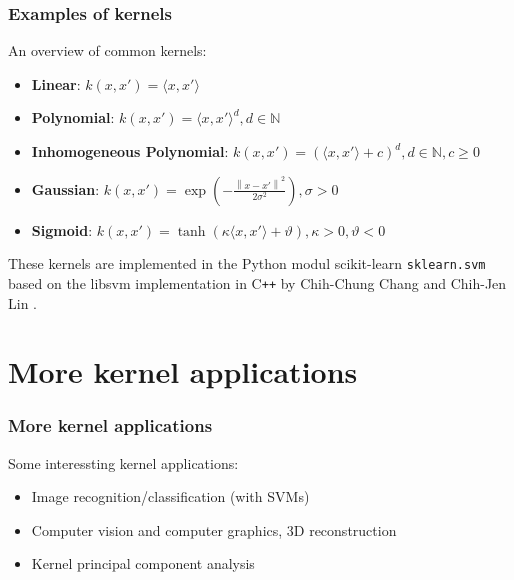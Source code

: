 \documentclass{beamer}
\begin{document}
\begin{frame}{}
	\frametitle{Examples of kernels}
    An overview of common kernels:
    \begin{itemize}
        \item \textbf{Linear}: $k(x,x') = \langle x, x' \rangle$
        \item \textbf{Polynomial}: $k(x,x') = \langle x, x' \rangle^{d}, d \in \mathbb{N}$
        \item \textbf{Inhomogeneous Polynomial}: $k(x,x') = \left( \langle x, x' \rangle + c \right)^{d}, d \in \mathbb{N}, c \geq 0$
        \item \textbf{Gaussian}: $k(x, x') = \exp \left( - \frac{\left\lVert x - x' \right\rVert^2}{2 \sigma^2} \right), \sigma > 0$
        \item \textbf{Sigmoid}: $k(x, x') = \tanh \left( \kappa \langle x, x' \rangle + \vartheta \right), \kappa > 0, \vartheta < 0$
    \end{itemize}
    \bigskip
    These kernels are implemented in the Python modul scikit-learn \texttt{sklearn.svm} based on the libsvm implementation in C\texttt{++} by Chih-Chung Chang and Chih-Jen Lin \cite{libsvm}.
\end{frame}




\section{More kernel applications}

\begin{frame}{}
	\frametitle{More kernel applications}
    Some interessting kernel applications:
    \begin{itemize}
        \item Image recognition/classification (with SVMs)
        \item Computer vision and computer graphics, 3D reconstruction
        \item Kernel principal component analysis
    \end{itemize}
\end{frame}



\end{document}
